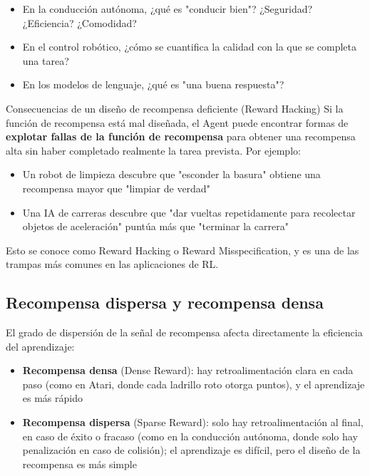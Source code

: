 \documentclass[a4paper]{article}
\begin{document}
\begin{itemize}
    \item En la conducción autónoma, ¿qué es "conducir bien"? ¿Seguridad? ¿Eficiencia? ¿Comodidad?
    \item En el control robótico, ¿cómo se cuantifica la calidad con la que se completa una tarea?
    \item En los modelos de lenguaje, ¿qué es "una buena respuesta"?
\end{itemize}

\begin{warningbox}{Consecuencias de un diseño de recompensa deficiente (Reward Hacking)}
Si la función de recompensa está mal diseñada, el Agent puede encontrar formas de \textbf{explotar fallas de la función de recompensa} para obtener una recompensa alta sin haber completado realmente la tarea prevista. Por ejemplo:
\begin{itemize}
    \item Un robot de limpieza descubre que "esconder la basura" obtiene una recompensa mayor que "limpiar de verdad"
    \item Una IA de carreras descubre que "dar vueltas repetidamente para recolectar objetos de aceleración" puntúa más que "terminar la carrera"
\end{itemize}
Esto se conoce como Reward Hacking o Reward Misspecification, y es una de las trampas más comunes en las aplicaciones de RL.
\end{warningbox}

\subsection{Recompensa dispersa y recompensa densa}

El grado de dispersión de la señal de recompensa afecta directamente la eficiencia del aprendizaje:

\begin{itemize}
    \item \textbf{Recompensa densa} (Dense Reward): hay retroalimentación clara en cada paso (como en Atari, donde cada ladrillo roto otorga puntos), y el aprendizaje es más rápido
    \item \textbf{Recompensa dispersa} (Sparse Reward): solo hay retroalimentación al final, en caso de éxito o fracaso (como en la conducción autónoma, donde solo hay penalización en caso de colisión); el aprendizaje es difícil, pero el diseño de la recompensa es más simple
\end{itemize}
\end{document}

